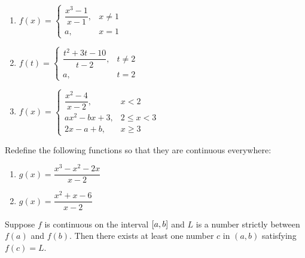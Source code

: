 \documentclass[../mathNotesPreamble]{subfiles}
\begin{document}
    \begin{enumerate}[itemsep=\stretch{1}]
      \item 
        $f(x)=\begin{cases}
          \dfrac{x^3-1}{x-1},& x\neq 1\\
          a,& x=1
        \end{cases}$
      \item 
        $f(t)=\begin{cases}
          \dfrac{t^2+3t-10}{t-2},& t\neq2\\
          a,& t=2
        \end{cases}$
    \pagebreak

      \item 
        $f(x)=\begin{cases}
          \dfrac{x^2-4}{x-2},& x<2\\
          ax^2-bx+3,& 2\leq x<3\\
          2x-a+b,& x\geq 3
        \end{cases}$
    \end{enumerate}
  \begin{ex*}
    Redefine the following functions so that they are continuous everywhere:
    \begin{enumerate}[itemsep=\stretch{1}]
      \item $g(x)=\dfrac{x^3-x^2-2x}{x-2}$
      \item $g(x)=\dfrac{x^2+x-6}{x-2}$
    \end{enumerate}
  \end{ex*}
  \pagebreak
  
  \begin{thmBox*}
    Suppose $f$ is continuous on the interval ${\left[a,b\right]}$ and $L$ is a number strictly between $f(a)$ and $f(b)$. Then there exists at least one number $c$ in $(a,b)$ satisfying $f(c)=L$.
  \end{thmBox*}
  
\end{document}
